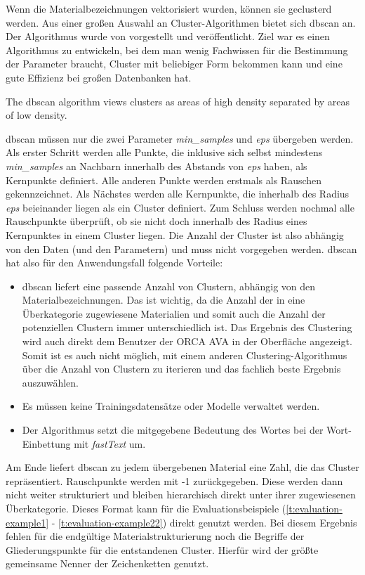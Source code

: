 Wenn die Materialbezeichnungen vektorisiert wurden, können sie geclusterd werden. Aus einer großen Auswahl an Cluster-Algorithmen bietet sich \ac{dbscan} an. Der Algorithmus wurde \citeyear{Ester1996ADA} von \citeauthor{Ester1996ADA} vorgestellt und veröffentlicht. Ziel war es einen Algorithmus zu entwickeln, bei dem man wenig Fachwissen für die Bestimmung der Parameter braucht, Cluster mit beliebiger Form bekommen kann und eine gute Effizienz bei großen Datenbanken hat.
\begin{displayquote}
	\glqq The \ac{dbscan} algorithm views clusters as areas of high density separated by areas of low density.\grqq{} \citep{scikitlearn_clustering}
\end{displayquote}
\ac{dbscan} müssen nur die zwei Parameter \textit{min\_samples} und \textit{eps} übergeben werden. Als erster Schritt werden alle Punkte, die inklusive sich selbst mindestens \textit{min\_samples} an Nachbarn innerhalb des Abstands von \textit{eps} haben, als Kernpunkte definiert. Alle anderen Punkte werden erstmals als Rauschen gekennzeichnet. Als Nächstes werden alle Kernpunkte, die inherhalb des Radius \textit{eps} beieinander liegen als ein Cluster definiert. Zum Schluss werden nochmal alle Rauschpunkte überprüft, ob sie nicht doch innerhalb des Radius eines Kernpunktes in einem Cluster liegen. \citep[vgl.][]{scikitlearn_clustering,Ester1996ADA} Die Anzahl der Cluster ist also abhängig von den Daten (und den Parametern) und muss nicht vorgegeben werden.
\ac{dbscan} hat also für den Anwendungsfall folgende Vorteile:

\begin{itemize}
	\item \ac{dbscan} liefert eine passende Anzahl von Clustern, abhängig von den Materialbezeichnungen. Das ist wichtig, da die Anzahl der in eine Überkategorie zugewiesene Materialien und somit auch die Anzahl der potenziellen Clustern immer unterschiedlich ist. Das Ergebnis des Clustering wird auch direkt dem Benutzer der ORCA AVA in der Oberfläche angezeigt. Somit ist es auch nicht möglich, mit einem anderen Clustering-Algorithmus über die Anzahl von Clustern zu iterieren und das fachlich beste Ergebnis auszuwählen.
	\item Es müssen keine Trainingsdatensätze oder Modelle verwaltet werden.
	\item Der Algorithmus setzt die mitgegebene Bedeutung des Wortes bei der Wort-Einbettung mit \textit{fastText} um. 
\end{itemize}

Am Ende liefert \ac{dbscan} zu jedem übergebenen Material eine Zahl, die das Cluster repräsentiert. Rauschpunkte werden mit -1 zurückgegeben. Diese werden dann nicht weiter strukturiert und bleiben hierarchisch direkt unter ihrer zugewiesenen Überkategorie. Dieses Format kann für die Evaluationsbeispiele (\autoref{t:evaluation-example1} - \autoref{t:evaluation-example22}) direkt genutzt werden. Bei diesem Ergebnis fehlen für die endgültige Materialstrukturierung noch die Begriffe der Gliederungspunkte für die entstandenen Cluster. Hierfür wird der größte gemeinsame Nenner der Zeichenketten genutzt.

